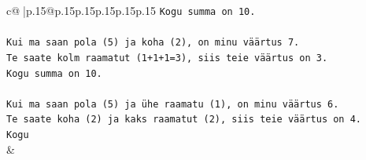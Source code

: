 \documentclass{article}
\begin{document}
{\begin{supertabular}{c@{$\;$}|p{.15\linewidth}@{}p{.15\linewidth}p{.15\linewidth}p{.15\linewidth}p{.15\linewidth}p{.15\linewidth}}
{{{\texttt{Kogu summa on 10.} \\
\\ 
\texttt{Kui ma saan pola (5) ja koha (2), on minu väärtus 7.} \\
\texttt{Te saate kolm raamatut (1+1+1=3), siis teie väärtus on 3.} \\
\texttt{Kogu summa on 10.} \\
\\ 
\texttt{Kui ma saan pola (5) ja ühe raamatu (1), on minu väärtus 6.} \\
\texttt{Te saate koha (2) ja kaks raamatut (2), siis teie väärtus on 4.} \\
\texttt{Kogu} \\
            }
        }
    }
    & \\ \\


\end{supertabular}}
\end{document}
